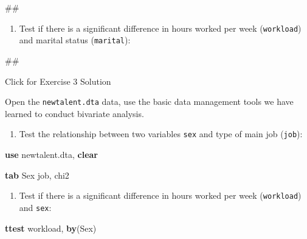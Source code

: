 \documentclass[
]{book}
\newenvironment{Shaded}{\begin{snugshade}}{\end{snugshade}}
\newcommand{\FunctionTok}[1]{\textcolor[rgb]{0.00,0.00,0.00}{#1}}
\newcommand{\KeywordTok}[1]{\textcolor[rgb]{0.13,0.29,0.53}{\textbf{#1}}}
\newcommand{\NormalTok}[1]{#1}
\providecommand{\tightlist}{%
  \setlength{\itemsep}{0pt}\setlength{\parskip}{0pt}}
\begin{document}
\begin{Shaded}
\begin{Highlighting}[]
\NormalTok{\#\#}
\end{Highlighting}
\end{Shaded}

\begin{enumerate}
\def\labelenumi{\arabic{enumi}.}
\setcounter{enumi}{2}
\tightlist
\item
  Test if there is a significant difference in hours worked per week (\texttt{workload}) and marital status (\texttt{marital}):
\end{enumerate}

\begin{Shaded}
\begin{Highlighting}[]
\NormalTok{\#\#}
\end{Highlighting}
\end{Shaded}

{Click for Exercise 3 Solution}

Open the \texttt{newtalent.dta} data, use the basic data management tools we have learned to conduct bivariate analysis.

\begin{enumerate}
\def\labelenumi{\arabic{enumi}.}
\tightlist
\item
  Test the relationship between two variables \texttt{sex} and type of main job (\texttt{job}):
\end{enumerate}

\begin{Shaded}
\begin{Highlighting}[]
\KeywordTok{use}\NormalTok{ newtalent.dta, }\KeywordTok{clear} 

\KeywordTok{tab}\NormalTok{ Sex job, }\FunctionTok{chi2} 
\end{Highlighting}
\end{Shaded}

\begin{enumerate}
\def\labelenumi{\arabic{enumi}.}
\setcounter{enumi}{1}
\tightlist
\item
  Test if there is a significant difference in hours worked per week (\texttt{workload}) and \texttt{sex}:
\end{enumerate}

\begin{Shaded}
\begin{Highlighting}[]
\KeywordTok{ttest}\NormalTok{ workload, }\KeywordTok{by}\NormalTok{(Sex)}
\end{Highlighting}
\end{Shaded}
\end{document}
